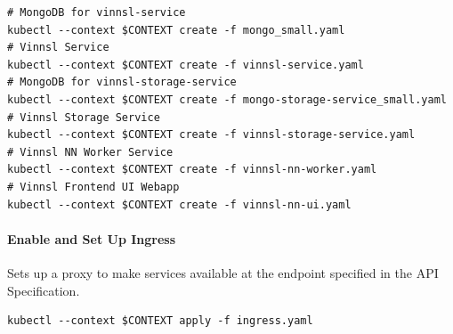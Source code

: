 \begin{verbatim}
# MongoDB for vinnsl-service
kubectl --context $CONTEXT create -f mongo_small.yaml 
# Vinnsl Service
kubectl --context $CONTEXT create -f vinnsl-service.yaml
# MongoDB for vinnsl-storage-service
kubectl --context $CONTEXT create -f mongo-storage-service_small.yaml
# Vinnsl Storage Service
kubectl --context $CONTEXT create -f vinnsl-storage-service.yaml
# Vinnsl NN Worker Service
kubectl --context $CONTEXT create -f vinnsl-nn-worker.yaml
# Vinnsl Frontend UI Webapp
kubectl --context $CONTEXT create -f vinnsl-nn-ui.yaml
\end{verbatim}

\paragraph{Enable and Set Up Ingress}\label{enable-and-set-up-ingress-1}

Sets up a proxy to make services available at the endpoint specified in
the API Specification.

\begin{verbatim}
kubectl --context $CONTEXT apply -f ingress.yaml
\end{verbatim}

\section{}\label{section-2}
